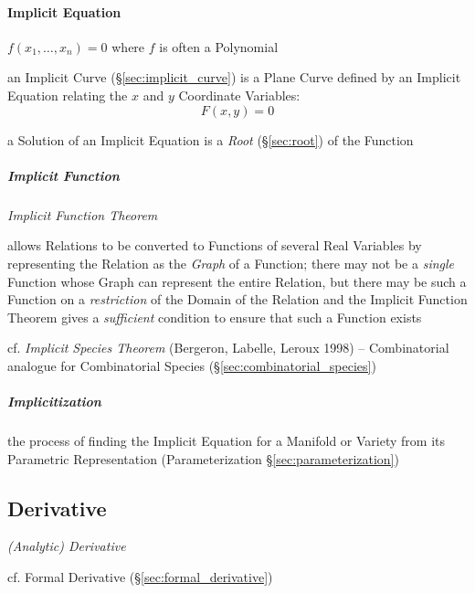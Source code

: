 \paragraph{Implicit Equation}\label{sec:implicit_equation}\hfill


$f(x_1, \ldots, x_n) = 0$ where $f$ is often a Polynomial

\fist an Implicit Curve (\S\ref{sec:implicit_curve}) is a Plane Curve defined by
an Implicit Equation relating the $x$ and $y$ Coordinate Variables:
\[
  F(x,y) = 0
\]

a Solution of an Implicit Equation is a \emph{Root} (\S\ref{sec:root}) of the
Function



\subparagraph{Implicit Function}\label{sec:implicit_function}\hfill

\emph{Implicit Function Theorem}

allows Relations to be converted to Functions of several Real Variables by
representing the Relation as the \emph{Graph} of a Function; there may not be a
\emph{single} Function whose Graph can represent the entire Relation, but there
may be such a Function on a \emph{restriction} of the Domain of the Relation and
the Implicit Function Theorem gives a \emph{sufficient} condition to ensure that
such a Function exists

cf. \emph{Implicit Species Theorem} (Bergeron, Labelle, Leroux 1998) --
Combinatorial analogue for Combinatorial Species
(\S\ref{sec:combinatorial_species})



\subparagraph{Implicitization}\label{sec:implicitization}\hfill

the process of finding the Implicit Equation for a Manifold or Variety from its
Parametric Representation (Parameterization \S\ref{sec:parameterization})



\subsection{Derivative}\label{sec:derivative}

\emph{(Analytic) Derivative}

\fist cf. Formal Derivative (\S\ref{sec:formal_derivative})

